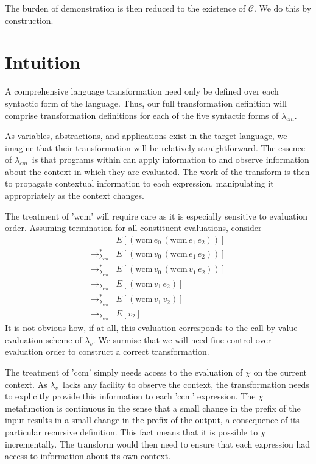 \documentclass[ms,electronic,twosidetoc,letterpaper,chaptercenter,parttop]{byumsphd}
\newcommand{\lv}{$\lambda_v$}
\newcommand{\cm}{$\lambda_{cm}$}
\newcommand{\cmrr}{\rightarrow_{\lambda_{cm}}}
\newcommand{\cmrrs}{\rightarrow_{\lambda_{cm}}^{*}}
\newcommand{\wcm}[2]{(\mathrm{wcm}\,#1\,#2)}
\begin{document}
The burden of demonstration is then reduced to the existence of $\mathcal{C}$. We do this by construction.

\section{Intuition}

A comprehensive language transformation need only be defined over each syntactic form of the language. Thus, our full transformation definition will comprise transformation definitions for each of the five syntactic forms of \cm.

As variables, abstractions, and applications exist in the target language, we imagine that their transformation will be relatively straightforward. The essence of \cm\ is that programs within can apply information to and observe information about the context in which they are evaluated. The work of the transform is then to propagate contextual information to each expression, manipulating it appropriately as the context changes.

The treatment of \scheme'wcm' will require care as it is especially sensitive to evaluation order. Assuming termination for all constituent evaluations, consider
\begin{align*}
       &E[\wcm{e_0}{\wcm{e_1}{e_2}}]\\
\cmrrs &E[\wcm{v_0}{\wcm{e_1}{e_2}}]\\
\cmrrs &E[\wcm{v_0}{\wcm{v_1}{e_2}}]\\
\cmrr  &E[\wcm{v_1}{e_2}]\\
\cmrrs &E[\wcm{v_1}{v_2}]\\
\cmrr  &E[v_2]
\end{align*}
It is not obvious how, if at all, this evaluation corresponds to the call-by-value evaluation scheme of \lv. We surmise that we will need fine control over evaluation order  to construct a correct transformation.

The treatment of \scheme'ccm' simply needs access to the evaluation of $\chi$ on the current context. As \lv\ lacks any facility to observe the context, the transformation needs to explicitly provide this information to each \scheme'ccm' expression. The $\chi$ metafunction is continuous in the sense that a small change in the prefix of the input results in a small change in the prefix of the output, a consequence of its particular recursive definition. This fact means that it is possible to $\chi$ incrementally. The transform would then need to ensure that each expression had access to information about its own context.
\end{document}
